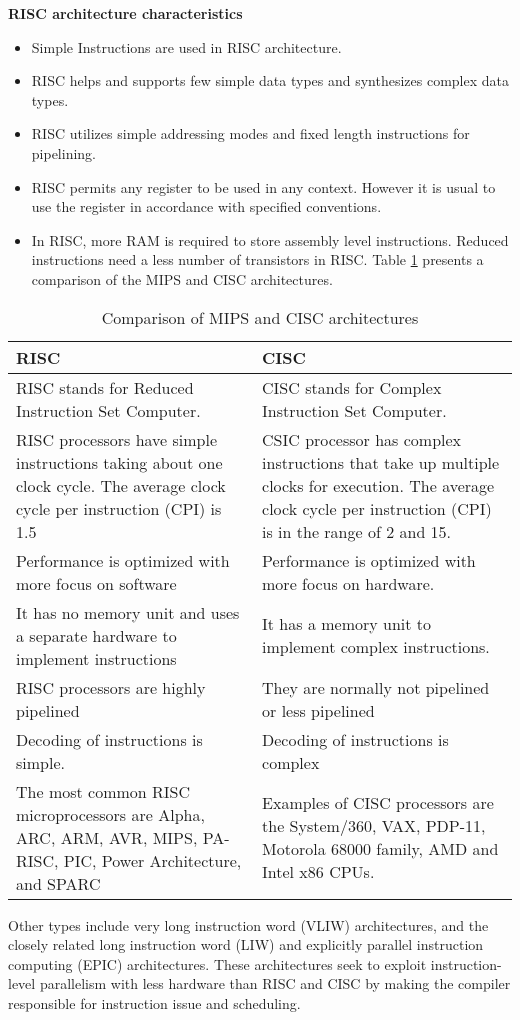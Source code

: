 \documentclass[12pt]{report}
\begin{document}
\begin{enumerate}
\textbf{RISC architecture characteristics}
\begin{itemize}
\item Simple Instructions are used in RISC architecture.
\item RISC helps and supports few simple data types and synthesizes complex data types.
\item RISC utilizes simple addressing modes and fixed length instructions for pipelining.
\item RISC permits any register to be used in any context. However it is usual to use the register in accordance with specified conventions.
\item In RISC, more RAM is required to store assembly level instructions.
Reduced instructions need a less number of transistors in RISC. Table \ref{tab:mips_vs_cisc} presents a comparison of the MIPS and CISC architectures.
\end{itemize}
\end{enumerate}
\begin{longtable}{|p{7cm}|p{7cm}|}
\caption{Comparison of MIPS and CISC architectures}  \label{tab:mips_vs_cisc} \\
\hline
RISC&CISC\\\hline
 RISC stands for Reduced Instruction Set Computer.&CISC stands for Complex Instruction Set Computer.\\\hline
 RISC processors have simple instructions taking about one clock cycle. The average clock cycle per instruction (CPI) is 1.5& CSIC processor has complex instructions that take up multiple clocks for execution. The average clock cycle per instruction (CPI) is in the range of 2 and 15.\\\hline
 Performance is optimized with more focus on software& Performance is optimized with more focus on hardware.\\\hline
 It has no memory unit and uses a separate hardware to implement instructions&It has a memory unit to implement complex instructions.\\\hline
 RISC processors are highly pipelined & They are normally not pipelined or less pipelined\\\hline
Decoding of instructions is simple.&Decoding of instructions is complex\\\hline
The most common RISC microprocessors are Alpha, ARC, ARM, AVR, MIPS, PA-RISC, PIC, Power Architecture, and SPARC & Examples of CISC processors are the System/360, VAX, PDP-11, Motorola 68000 family, AMD and Intel x86 CPUs.\\\hline
\end{longtable}
Other types include very long instruction word (VLIW) architectures, and the closely related long instruction word (LIW) and explicitly parallel instruction computing (EPIC) architectures. These architectures seek to exploit instruction-level parallelism with less hardware than RISC and CISC by making the compiler responsible for instruction issue and scheduling.
\end{document}
